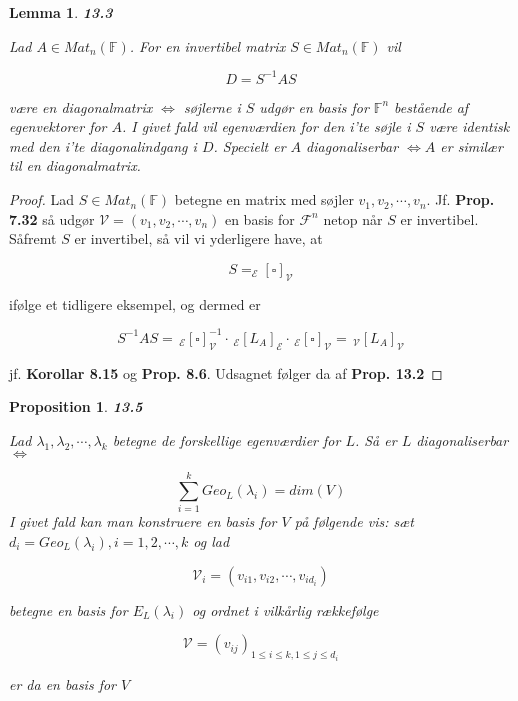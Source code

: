 \documentclass[paper=a4, fontsize=11pt]{scrartcl} %
\newtheorem*{lemma}{Lemma}
\newtheorem*{proposition}{Proposition}
\newenvironment{cstmproposition}[1]{\begin{proposition} {\normalfont\textbf{#1}}}{\end{proposition}}
\newenvironment{cstmlemma}[1]{\begin{lemma} {\normalfont\textbf{#1}}}{\end{lemma}}
\begin{document}
			
			\begin{cstmlemma}{13.3}
				
				Lad $A \in Mat_n(\mathbb{F})$. For en invertibel matrix $S \in Mat_n(\mathbb{F})$ vil
				
				\[D = S^{-1} A S\]
				
				være en diagonalmatrix $\Leftrightarrow$ søjlerne i $S$ udgør en basis for $\mathbb{F}^n$ bestående af egenvektorer for $A$. I givet fald vil egenværdien for den i'te søjle i $S$ være identisk med den i'te diagonalindgang i $D$. Specielt er $A$ diagonaliserbar $\Leftrightarrow A$ er similær til en diagonalmatrix. 
				
			\end{cstmlemma}
			
			\begin{proof}
				
				Lad $S \in Mat_n(\mathbb{F})$ betegne en matrix med søjler $v_1,v_2,\cdots,v_n$. Jf. \textbf{Prop. 7.32} så udgør $\mathcal{V} = (v_1,v_2,\cdots,v_n)$ en basis for $\mathcal{F}^n$ netop når $S$ er invertibel. Såfremt $S$ er invertibel, så vil vi yderligere have, at 
				
				\[S = _{\mathcal{E}}[{\scriptstyle\square}]_{\mathcal{V}}\]
				
				ifølge et tidligere eksempel, og dermed er
				
				\[S^{-1}AS = \, _{\mathcal{E}}[{\scriptstyle\square}]_{\mathcal{V}}^{-1} \cdot \, _{\mathcal{E}}[L_A]_{\mathcal{E}} \cdot \, _{\mathcal{E}}[{\scriptstyle\square}]_{\mathcal{V}} = \, _{\mathcal{V}}[L_A]_{\mathcal{V}}\]
				
				jf. \textbf{Korollar 8.15} og \textbf{Prop. 8.6}. Udsagnet følger da af \textbf{Prop. 13.2}
				
			\end{proof}
			
			
			\begin{cstmproposition}{13.5}
				
				Lad $\lambda_1,\lambda_2,\cdots,\lambda_k$ betegne de forskellige egenværdier for $L$. Så er $L$ diagonaliserbar $\Leftrightarrow$
				
				\[\sum_{i=1}^k Geo_L(\lambda_i) = dim(V) \tag{13.2}\]
				I givet fald kan man konstruere en basis for $V$ på følgende vis: sæt $d_i = Geo_L(\lambda_i), i = 1,2,\cdots,k$ og lad 
				
				\[\mathcal{V}_i = (v_{i1},v_{i2},\cdots,v_{id_i})\]
				
				betegne en basis for $E_L(\lambda_i)$ og ordnet i vilkårlig rækkefølge
				
				\[\mathcal{V} = (v_{ij})_{1 \leq i \leq k, 1 \leq j \leq d_i}\]
				
				er da en basis for $V$
				
				
			\end{cstmproposition}
			
\end{document}
